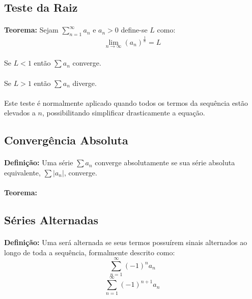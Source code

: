 \documentclass{article}
\begin{document}
    \subsection{Teste da Raiz}
        \paragraph{}\textbf{Teorema:} Sejam $\sum\limits_{n=1}^{\infty}a_{n}$ e $a_{n}>0$ define-se $L$ como:
            \[\lim_{n\to\infty}{(a_{n})}^{\frac{1}{n}}=L\]
        \paragraph{}Se $L<1$ então $\sum a_{n}$ converge.
        \paragraph{}Se $L>1$ então $\sum a_{n}$ diverge.
        \paragraph{}Este teste é normalmente aplicado quando todos os termos da sequência estão elevados a $n$, possibilitando simplificar drasticamente a equação.

    \subsection{Convergência Absoluta}
        \paragraph{}\textbf{Definição:} Uma série $\sum a_{n}$ converge absolutamente se sua série absoluta equivalente, $\sum |a_{n}|$, converge.
        \paragraph{}\textbf{Teorema:}
        
    \subsection{Séries Alternadas}
        \paragraph{}\textbf{Definição:} Uma será alternada se seus termos possuírem sinais alternados ao longo de toda a sequência, formalmente descrito como:
            \[\sum\limits_{n=1}^{\infty}(-1)^{n}a_{n}\]
            \[\sum\limits_{n=1}^{\infty}(-1)^{n+1}a_{n}\]
    
\end{document}
